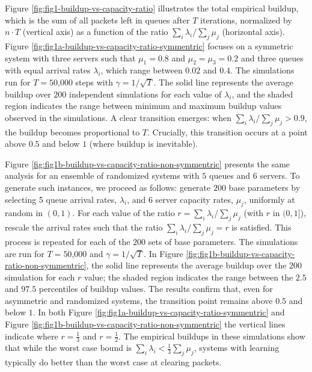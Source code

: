 Figure \ref{fig:fig1-buildup-vs-capacity-ratio} illustrates the total empirical buildup, which is the sum of all packets left in queues after $T$ iterations, normalized by $n \cdot T$ (vertical axis) as a function of the ratio $\sum_i \lambda_i/\sum_j \mu_j$ (horizontal axis). 
Figure \ref{fig:fig1a-buildup-vs-capacity-ratio-symmentric} focuses on a symmetric system with three servers such that $\mu_1 = 0.8$ and $\mu_2 = \mu_3 = 0.2$ and three queues with equal arrival rates $\lambda_i$, which range between $0.02$ and $0.4$. The simulations run for $T = 50$,$000$ steps with $\gamma = 1/\sqrt{T}$. The solid line represents the average buildup over $200$ independent simulations for each value of $\lambda_i$, and the shaded region indicates the range between minimum and maximum buildup values observed in the simulations. A clear transition emerges: when $\sum_i \lambda_i/\sum_j \mu_j > 0.9$, the buildup becomes proportional to $T$. Crucially, this transition occurs at a point above $0.5$ and below $1$ (where buildup is inevitable). 

Figure \ref{fig:fig1b-buildup-vs-capacity-ratio-non-symmentric} presents the same analysis for an ensemble of randomized systems with $5$ queues and $6$ servers. To generate such instances, we proceed as follows: generate $200$ base parameters by selecting 5 queue arrival rates, $\lambda_i$, and 6 server capacity rates, $\mu_j$, uniformly at random in $(0,1)$. For each value of the ratio $r = \sum_i \lambda_i/\sum_j \mu_j$ (with $r$ in $(0, 1]$), rescale the arrival rates such that the ratio $\sum_i \lambda_i/\sum_j\mu_j = r$ is satisfied. 
This process is repeated for each of the $200$ sets of base parameters. The simulations are run for $T = 50$,$000$ and %
$\gamma = 1/\sqrt{T}$. In Figure \ref{fig:fig1b-buildup-vs-capacity-ratio-non-symmentric}, the solid line represents the average buildup over the $200$ simulation for each $r$ value; the shaded region indicates the range between the $2.5$ and $97.5$ percentiles of buildup values. The results confirm that, even for asymmetric and randomized systems, the transition point remains above $0.5$ and below $1$. In both Figure \ref{fig:fig1a-buildup-vs-capacity-ratio-symmentric} and Figure \ref{fig:fig1b-buildup-vs-capacity-ratio-non-symmentric} the vertical lines indicate where $r = \frac{1}{3}$ and $r = \frac{1}{2}$. The empirical buildups in these simulations show that while the worst case bound is $\sum_i\lambda_i < \frac{1}{3} \sum_j \mu_j$, systems with learning typically do better than the worst case at clearing packets.


